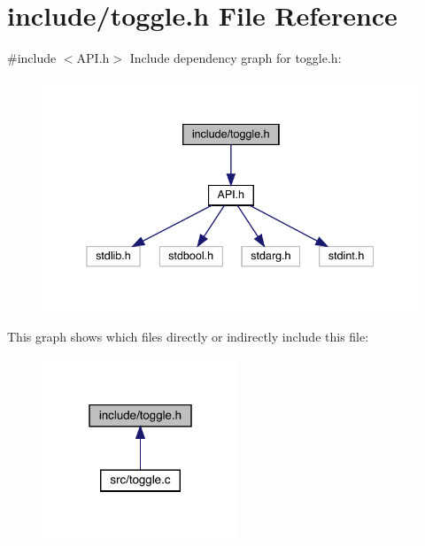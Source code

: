 \section{include/toggle.h File Reference}
\label{toggle_8h}
{\ttfamily \#include $<$A\+P\+I.\+h$>$}\newline
Include dependency graph for toggle.\+h\+:\nopagebreak
\begin{figure}[H]
\begin{center}
\leavevmode
\includegraphics[width=338pt]{toggle_8h__incl}
\end{center}
\end{figure}
This graph shows which files directly or indirectly include this file\+:\nopagebreak
\begin{figure}[H]
\begin{center}
\leavevmode
\includegraphics[width=166pt]{toggle_8h__dep__incl}
\end{center}
\end{figure}
